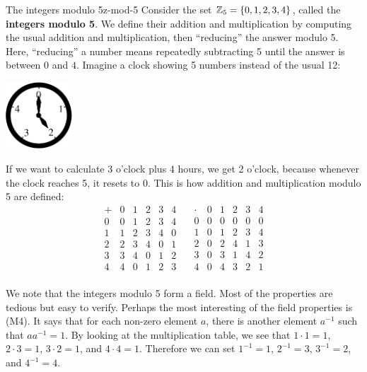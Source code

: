 \begin{example}{The integers modulo 5}{z-mod-5}
  Consider the set $\mathbb{Z}_5=\left\{0,1,2,3,4\right\}$, called the
  \textbf{integers modulo 5}. We define their
  addition and multiplication by computing the usual addition and
  multiplication, then ``reducing'' the answer modulo 5. Here,
  ``reducing'' a number means repeatedly subtracting 5 until the
  answer is between $0$ and $4$. Imagine a clock showing 5 numbers
  instead of the usual 12:
  \begin{center}
    \includegraphics[width=2.5cm]{figures/clock}
  \end{center}
  If we want to calculate 3 o'clock plus 4 hours, we get 2 o'clock,
  because whenever the clock reaches 5, it resets to 0. This is how
  addition and multiplication modulo 5 are defined:
  \begin{equation*}
    \begin{array}{l|lllll}
      +&0&1&2&3&4 \\\hline
      0&0&1&2&3&4 \\
      1&1&2&3&4&0 \\
      2&2&3&4&0&1 \\
      3&3&4&0&1&2 \\
      4&4&0&1&2&3 \\
    \end{array}
    \quad
    \begin{array}{l|lllll}
      \cdot&0&1&2&3&4 \\\hline
      0&0&0&0&0&0 \\
      1&0&1&2&3&4 \\
      2&0&2&4&1&3 \\
      3&0&3&1&4&2 \\
      4&0&4&3&2&1 \\
    \end{array}
  \end{equation*}
\end{example}

We note that the integers modulo 5 form a field. Most of the
properties are tedious but easy to verify. Perhaps the most
interesting of the field properties is (M4). It says that for each
non-zero element $a$, there is another element $a^{-1}$ such that
$aa^{-1}=1$.  By looking at the multiplication table, we see that
$1\cdot 1=1$, $2\cdot 3=1$, $3\cdot 2=1$, and $4\cdot 4=1$. Therefore
we can set $1^{-1}=1$, $2^{-1}=3$, $3^{-1}=2$, and $4^{-1}=4$.

